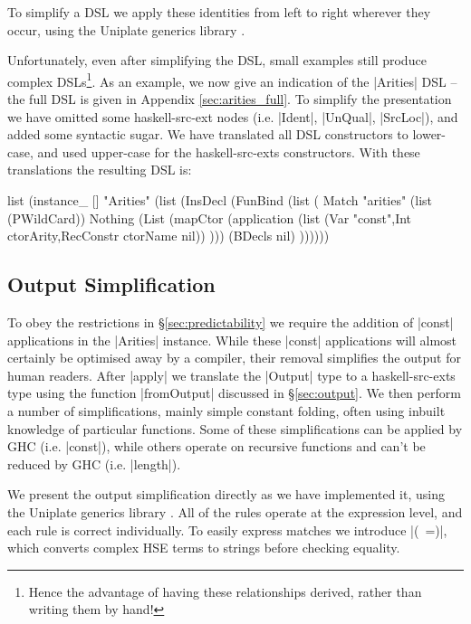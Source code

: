 \documentclass[preprint,draft]{sigplanconf}
\begin{document}
To simplify a DSL we apply these identities from left to right wherever they occur, using the Uniplate generics library \cite{me:uniplate}.

Unfortunately, even after simplifying the DSL, small examples still produce complex DSLs\footnote{Hence the advantage of having these relationships derived, rather than writing them by hand!}. As an example, we now give an indication of the |Arities| DSL -- the full DSL is given in Appendix \ref{sec:arities_full}. To simplify the presentation we have omitted some haskell-src-ext nodes (i.e. |Ident|, |UnQual|, |SrcLoc|), and added some syntactic sugar. We have translated all DSL constructors to lower-case, and used upper-case for the haskell-src-exts constructors. With these translations the resulting DSL is:

\ignore\begin{code}
list (instance_ [] "Arities" (list (InsDecl (FunBind (list (
    Match "arities"
        (list (PWildCard))
        Nothing
        (List (mapCtor (application
            (list (Var "const",Int ctorArity,RecConstr ctorName nil))
        )))
        (BDecls nil)
))))))
\end{code}

\subsection{Output Simplification}
\label{sec:output_simplify}

To obey the restrictions in \S\ref{sec:predictability} we require the addition of |const| applications in the |Arities| instance. While these |const| applications will almost certainly be optimised away by a compiler, their removal simplifies the output for human readers. After |apply| we translate the |Output| type to a haskell-src-exts type using the function |fromOutput| discussed in \S\ref{sec:output}. We then perform a number of simplifications, mainly simple constant folding, often using inbuilt knowledge of particular functions. Some of these simplifications can be applied by GHC (i.e. |const|), while others operate on recursive functions and can't be reduced by GHC (i.e. |length|).

We present the output simplification directly as we have implemented it, using the Uniplate generics library \cite{me:uniplate}. All of the rules operate at the expression level, and each rule is correct individually. To easily express matches we introduce |(~=)|, which converts complex HSE terms to strings before checking equality.
\end{document}
